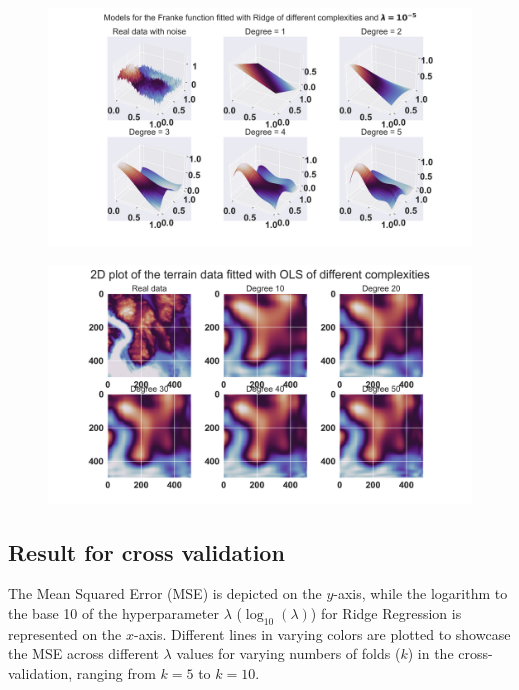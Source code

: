 \begin{figure}[h]
	\centering
	\includegraphics[width=\textwidth]{Figure_6.png}
	\caption{}
	\label{Ridge figure}
\end{figure}

\begin{figure}[h]
	\centering
	\includegraphics[width=\textwidth]{Figure_5.png}
	\caption{}
	\label{OLS figure terrain data}
\end{figure}

\subsection{Result for cross validation}
\noindent The Mean Squared Error (MSE) is depicted on the $y$-axis, while the logarithm to the base 10 of the hyperparameter $\lambda$ ($\log_{10}(\lambda)$) for Ridge Regression is represented on the $x$-axis. Different lines in varying colors are plotted to showcase the MSE across different $\lambda$ values for varying numbers of folds ($k$) in the cross-validation, ranging from $k=5$ to $k=10$. 

